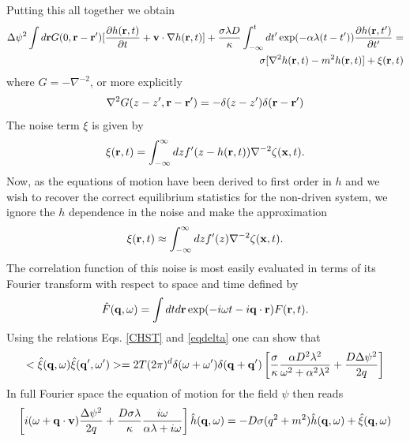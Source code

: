 Putting this all together we obtain
\begin{align}
    \Delta\psi^2 \int d{\bf r} G(0,{\bf r}-{\bf r}') [\frac{\partial h({\bf r},t)}{\partial t} +{\bf v}\cdot\nabla h({\bf r},t)] +\frac{\sigma\lambda D}{\kappa}\int_{-\infty}^t dt'
\exp(-\alpha\lambda(t-t'))\frac{\partial h({\bf r},t')}{\partial t'}
= \nonumber \\
 \sigma[\nabla^2 h({\bf r},t)-m^2 h({\bf r},t)] + \xi({\bf r},t)
    \label{em}
\end{align}
where $G= -\nabla^{-2}$, or more explicitly
\begin{equation}
    \nabla^2 G(z-z',{\bf r}-{\bf r}') = -\delta(z-z') \delta({\bf r}-{\bf r'})
\end{equation}
The noise term $\xi$ is given by
\begin{equation}
    \xi({\bf r},t) = \int_{-\infty}^{\infty} dz f'(z-h({\bf r},t)) \nabla^{-2} \zeta({\bf x},t).
\end{equation}
Now, as the equations of motion have been derived to first order in $h$ and we wish to recover the correct equilibrium statistics for the non-driven system, we ignore the $h$ dependence in the noise and make the approximation
\begin{equation}
    \xi({\bf r},t) \approx \int_{-\infty}^{\infty} dz f'(z) \nabla^{-2} \zeta({\bf x},t).
\end{equation}
The correlation function of this noise is most easily evaluated in terms of its Fourier transform with respect to  space and time  defined by
\begin{equation}
    \hat F({\bf q},\omega)=\int dt d{\bf r}\exp(-i\omega t -i{\bf q}\cdot{\bf r}) F({\bf r},t).
\end{equation}
Using the relations Eqs. \eqref{CHST} and \eqref{eqdelta} one  can show that
\begin{equation}
    < \hat \xi({\bf q},\omega)\hat \xi({\bf q}',\omega')> =2T(2\pi)^d \delta(\omega +\omega') \delta({\bf q}+{\bf q}') \left[ \frac{\sigma}{\kappa}\frac{\alpha D^2\lambda^2}{\omega^2 +\alpha^2\lambda^2} + \frac{D\Delta\psi^2}{2q}\right]
\end{equation}
In full Fourier space the equation of motion for the field $\psi$ then reads
\begin{equation}
    \left[i(\omega+{\bf q}\cdot{\bf v})\frac{\Delta\psi^2}{2q} + \frac{D\sigma\lambda}{\kappa} \frac{i\omega}{\alpha\lambda+i\omega}\right] \hat h({\bf q},\omega)= -D\sigma(q^2+m^2)\hat h({\bf q},\omega)+ \hat\xi({\bf q},\omega)
    \label{dyn}
\end{equation}

